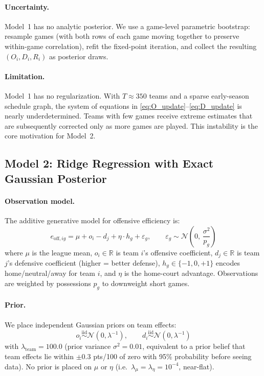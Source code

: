 \documentclass[11pt]{article}
\newcommand{\R}{\mathbb{R}}
\newcommand{\N}{\mathcal{N}}
\begin{document}
\paragraph{Uncertainty.}  Model~1 has no analytic posterior.  We use a
game-level parametric bootstrap: resample games (with both rows of each game
moving together to preserve within-game correlation), refit the fixed-point
iteration, and collect the resulting $(O_i, D_i, R_i)$ as posterior draws.

\paragraph{Limitation.}  Model~1 has no regularization.  With $T \approx 350$
teams and a sparse early-season schedule graph, the system of equations in
\eqref{eq:O_update}--\eqref{eq:D_update} is nearly underdetermined.  Teams
with few games receive extreme estimates that are subsequently corrected only as
more games are played.  This instability is the core motivation for Model~2.

\subsection{Model 2: Ridge Regression with Exact Gaussian Posterior}
\label{sec:model2}

\paragraph{Observation model.}  The additive generative model for offensive
efficiency is:
\begin{equation}
  e_{\text{off},ig} = \mu + o_i - d_j + \eta \cdot h_g + \varepsilon_g,
  \qquad \varepsilon_g \sim \N\!\left(0,\, \frac{\sigma^2}{p_g}\right)
  \label{eq:m2_obs}
\end{equation}
where $\mu$ is the league mean, $o_i \in \R$ is team $i$'s offensive
coefficient, $d_j \in \R$ is team $j$'s defensive coefficient (higher = better
defense), $h_g \in \{-1, 0, +1\}$ encodes home/neutral/away for team $i$, and
$\eta$ is the home-court advantage.  Observations are weighted by possessions
$p_g$ to downweight short games.

\paragraph{Prior.}  We place independent Gaussian priors on team effects:
\begin{equation}
  o_i \overset{\mathrm{iid}}{\sim} \N(0, \lambda^{-1}), \qquad
  d_i \overset{\mathrm{iid}}{\sim} \N(0, \lambda^{-1})
  \label{eq:prior}
\end{equation}
with $\lambda_{\text{team}} = 100.0$ (prior variance $\sigma^2 = 0.01$, equivalent to a prior belief that team effects lie within $\pm 0.3$ pts/100 of zero with 95\% probability before seeing data).  No prior is placed on $\mu$ or $\eta$ (i.e.\ $\lambda_\mu = \lambda_\eta = 10^{-4}$, near-flat).
\end{document}
